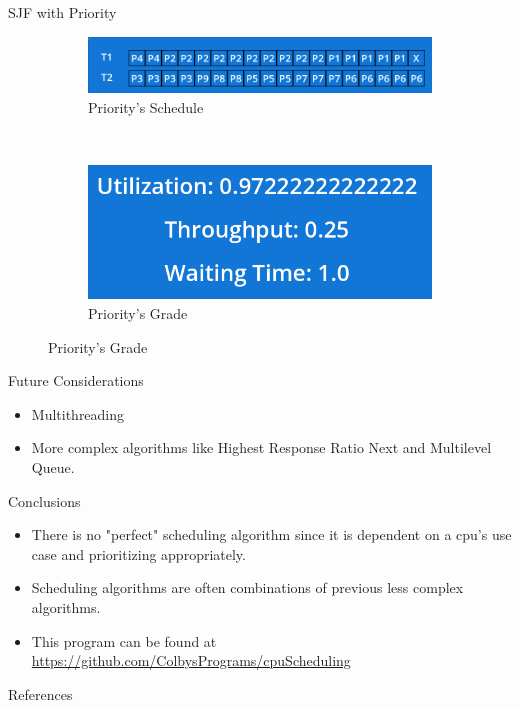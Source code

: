 \documentclass{beamer}
\begin{document}
\begin{frame}{SJF with Priority}
	\centering
	\begin{figure}[h!]
		\begin{subfigure}{0.9\textwidth}
			\includegraphics[width=1\textwidth]{PrioritySchedule.png}
			\caption*{\large Priority's Schedule}
		\end{subfigure} \\
		\begin{subfigure}{0.6\textwidth}
			\includegraphics[width=1\textwidth]{PriorityGrade.png}
			\caption*{\large Priority's Grade}
		\end{subfigure}
	\end{figure}
\end{frame}

\begin{frame}{Future Considerations}
	\begin{itemize}
		\item Multithreading
		\item More complex algorithms like Highest Response Ratio Next and Multilevel Queue.
	\end{itemize}
\end{frame}

\begin{frame}{Conclusions}
	\begin{itemize}
		\item There is no "perfect" scheduling algorithm since it is dependent on a cpu's use case and prioritizing appropriately.
		\item Scheduling algorithms are often combinations of previous less complex algorithms.
		\item This program can be found at \underline{https://github.com/ColbysPrograms/cpuScheduling}
	\end{itemize}
\end{frame}

\begin{frame}{References}
	\nocite{*}
	\printbibliography
\end{frame}
\end{document}
